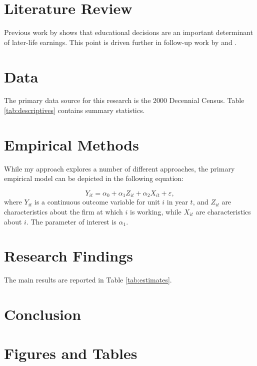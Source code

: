 \documentclass[12pt,english]{article}
\begin{document}
\section{Literature Review}\label{sec:litreview}
Previous work by \citet{altonji1993} shows that educational decisions are an important determinant of later-life earnings. This point is driven further in follow-up work by \citet{altonji_al2012} and \citet{altonji_al2016}.


\section{Data}\label{sec:data}
The primary data source for this research is the 2000 Decennial Census. Table \ref{tab:descriptives} contains summary statistics.




\section{Empirical Methods}\label{sec:methods}
While my approach explores a number of different approaches, the primary empirical model can be depicted in the following equation:

\begin{equation}
\label{eq:1}
Y_{it}=\alpha_{0} + \alpha_{1}Z_{it} + \alpha_{2} X_{it} + \varepsilon,
\end{equation}
where $Y_{it}$ is a continuous outcome variable for unit $i$ in year $t$, and $Z_{it}$ are characteristics about the firm at which $i$ is working, while $X_{it}$ are characteristics about $i$. The parameter of interest is $\alpha_{1}$.


\section{Research Findings}\label{sec:results}
The main results are reported in Table \ref{tab:estimates}.



\section{Conclusion}\label{sec:conclusion}


\vfill
\pagebreak{}
\begin{spacing}{1.0}


\end{spacing}

\vfill
\pagebreak{}
\clearpage

\section*{Figures and Tables}\label{sec:figTables}





\end{document}
